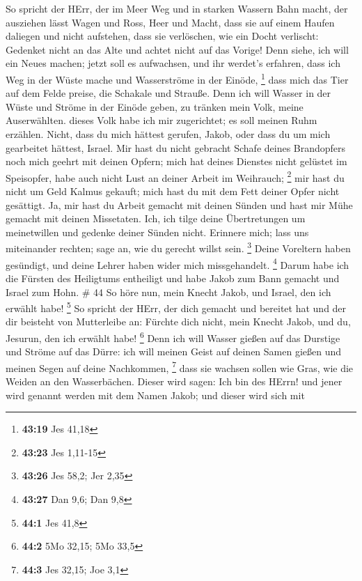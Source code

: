  So spricht der HErr, der im Meer Weg und in starken
Wassern Bahn macht,  der ausziehen lässt Wagen und Ross,
Heer und Macht, dass sie auf einem Haufen daliegen und nicht aufstehen,
dass sie verlöschen, wie ein Docht verlischt:  Gedenket
nicht an das Alte und achtet nicht auf das Vorige!  Denn
siehe, ich will ein Neues machen; jetzt soll es aufwachsen, und ihr
werdet's erfahren, dass ich Weg in der Wüste mache und Wasserströme in
der Einöde, \footnote{\textbf{43:19} Jes 41,18}  dass mich
das Tier auf dem Felde preise, die Schakale und Strauße. Denn ich will
Wasser in der Wüste und Ströme in der Einöde geben, zu tränken mein
Volk, meine Auserwählten.  dieses Volk habe ich mir
zugerichtet; es soll meinen Ruhm erzählen.  Nicht, dass du
mich hättest gerufen, Jakob, oder dass du um mich gearbeitet hättest,
Israel.  Mir hast du nicht gebracht Schafe deines
Brandopfers noch mich geehrt mit deinen Opfern; mich hat deines Dienstes
nicht gelüstet im Speisopfer, habe auch nicht Lust an deiner Arbeit im
Weihrauch; \footnote{\textbf{43:23} Jes 1,11-15}  mir hast
du nicht um Geld Kalmus gekauft; mich hast du mit dem Fett deiner Opfer
nicht gesättigt. Ja, mir hast du Arbeit gemacht mit deinen Sünden und
hast mir Mühe gemacht mit deinen Missetaten.  Ich, ich
tilge deine Übertretungen um meinetwillen und gedenke deiner Sünden
nicht.  Erinnere mich; lass uns miteinander rechten; sage
an, wie du gerecht willst sein. \footnote{\textbf{43:26} Jes 58,2; Jer
  2,35}  Deine Voreltern haben gesündigt, und deine Lehrer
haben wider mich missgehandelt. \footnote{\textbf{43:27} Dan 9,6; Dan
  9,8}  Darum habe ich die Fürsten des Heiligtums
entheiligt und habe Jakob zum Bann gemacht und Israel zum Hohn. \# 44
 So höre nun, mein Knecht Jakob, und Israel, den ich erwählt
habe! \footnote{\textbf{44:1} Jes 41,8}  So spricht der
HErr, der dich gemacht und bereitet hat und der dir beisteht von
Mutterleibe an: Fürchte dich nicht, mein Knecht Jakob, und du, Jesurun,
den ich erwählt habe! \footnote{\textbf{44:2} 5Mo 32,15; 5Mo 33,5}
 Denn ich will Wasser gießen auf das Durstige und Ströme auf
das Dürre: ich will meinen Geist auf deinen Samen gießen und meinen
Segen auf deine Nachkommen, \footnote{\textbf{44:3} Jes 32,15; Joe 3,1}
 dass sie wachsen sollen wie Gras, wie die Weiden an den
Wasserbächen.  Dieser wird sagen: Ich bin des HErrn! und
jener wird genannt werden mit dem Namen Jakob; und dieser wird sich mit
